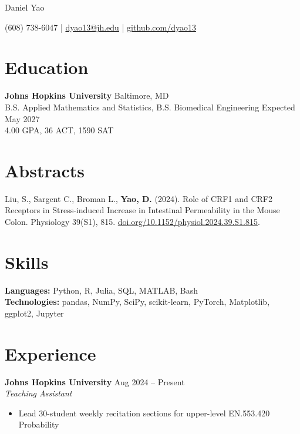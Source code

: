 \documentclass[11pt]{article}       %
\begin{document}
\centerline{\Huge Daniel Yao}

\vspace{5pt}

\centerline{(608) 738-6047 | \href{mailto:dyao13@jh.edu}{dyao13@jh.edu} | \href{https://github.com/dyao13/}{github.com/dyao13}}

\vspace{-9pt}

\section*{Education}
\textbf{Johns Hopkins University} \hfill Baltimore, MD \\
B.S. Applied Mathematics and Statistics, B.S. Biomedical Engineering \hfill Expected May 2027 \\
4.00 GPA, 36 ACT, 1590 SAT

\vspace{-9pt}

\section*{Abstracts}
Liu, S., Sargent C., Broman L., \textbf{Yao, D.} (2024). Role of CRF1 and CRF2 Receptors in Stress-induced Increase in Intestinal Permeability in the Mouse Colon. Physiology 39(S1), 815. \href{https://doi.org/10.1152/physiol.2024.39.S1.815}{doi.org/10.1152/physiol.2024.39.S1.815}.

\vspace{-9pt}

\section*{Skills}
\textbf{Languages:} Python, R, Julia, SQL, MATLAB, Bash \\
\textbf{Technologies:} pandas, NumPy, SciPy, scikit-learn, PyTorch, Matplotlib, ggplot2, Jupyter

\vspace{-9pt}

\section*{Experience}
\textbf{Johns Hopkins University} \hfill Aug 2024 – Present \\
\textit{Teaching Assistant} \vspace{-9pt} \\
\begin{itemize}
  \item Lead 30-student weekly recitation sections for upper-level EN.553.420 Probability
\end{itemize}
\end{document}
